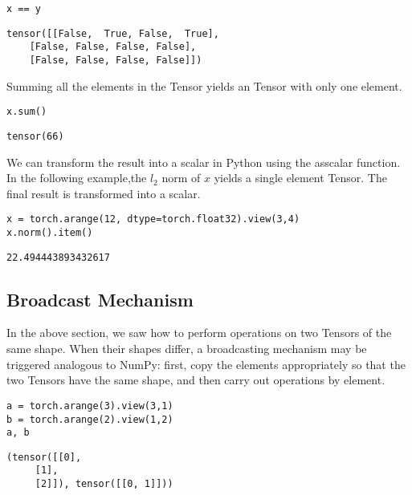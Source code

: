 \documentclass[]{article}
\begin{document}
\begin{verbatim}
x == y
\end{verbatim}

\begin{verbatim}
tensor([[False,  True, False,  True],
	[False, False, False, False],
	[False, False, False, False]])
\end{verbatim}

Summing all the elements in the Tensor yields an Tensor with only one element.

\begin{verbatim}
x.sum()
\end{verbatim}

\begin{verbatim}
tensor(66)
\end{verbatim}

We can transform the result into a scalar in Python using  the asscalar function. In the following example,the $ l_2 $ norm of $ x $ yields a single element Tensor. The final result is transformed into a scalar.

\begin{verbatim}
x = torch.arange(12, dtype=torch.float32).view(3,4)
x.norm().item()
\end{verbatim}

\begin{verbatim}
22.494443893432617
\end{verbatim}

\subsection{Broadcast Mechanism}

In the above section, we saw how to perform operations on two Tensors of the same shape. When their shapes differ, a broadcasting mechanism may be triggered analogous to NumPy: first, copy the elements appropriately so that the two Tensors have the same shape, and then carry out operations by element.

\begin{verbatim}
a = torch.arange(3).view(3,1)
b = torch.arange(2).view(1,2)
a, b
\end{verbatim}

\begin{verbatim}
(tensor([[0],
	 [1],
	 [2]]), tensor([[0, 1]]))
\end{verbatim}
\end{document}
